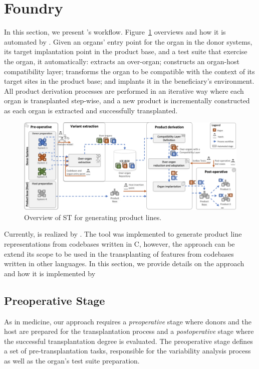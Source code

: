 \section{Foundry}
\label{sec:approach}

In this section, we present \FOUNDRY's workflow. Figure~\ref{fig:approach} overviews \FOUNDRY and how it is automated by \autoscalpel. Given an organs' entry point for the organ in the donor systems, its target implantation point in the product base, and a test suite that exercise the organ, it automatically: extracts an over-organ; constructs an organ-host compatibility layer; transforms the organ to be compatible with the context of its target sites in the product base; and implants it in the beneficiary's environment. All product derivation processes are performed in an iterative way where each organ is transplanted step-wise, and a new product is incrementally constructed as each organ is extracted and successfully transplanted. 

\begin{figure}[t]
	\centering  \includegraphics[width=18.5cm]{images/FOUNDRY3.png}
	\centering \caption{Overview of ST for generating product lines.}
	\label{fig:approach}
\end{figure} 

Currently, \FOUNDRY is realized by \autoscalpel. The tool was implemented to generate product line representations from codebases written in C, however, the \FOUNDRY approach can be extend its scope to be used in the transplanting of features from codebases written in other languages. In this  section,  we provide details on the approach and how it is implemented by \autoscalpel

\subsection{Preoperative Stage} 

As in medicine, our approach requires a \emph{preoperative} stage where donors and the host are prepared for the transplantation process and a \emph{postoperative} stage where the successful transplantation degree is evaluated. The preoperative stage defines a set of pre-transplantation tasks, responsible for the variability analysis process as well as the organ's test suite preparation. 

